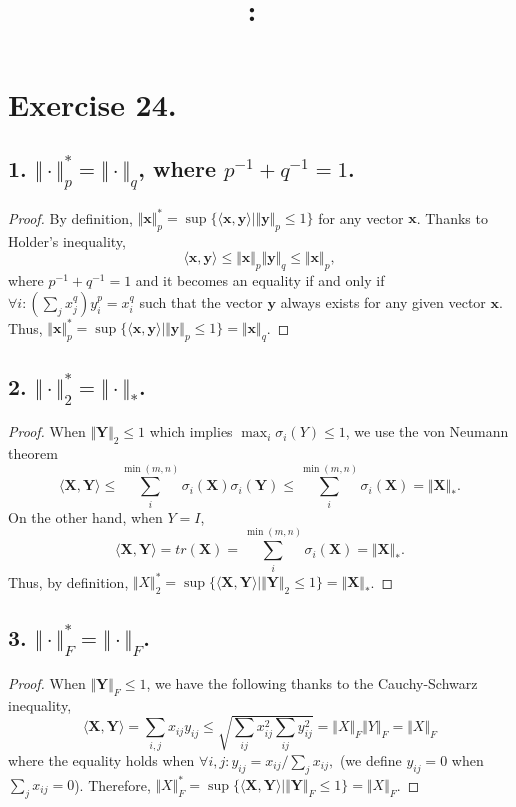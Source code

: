 \documentclass{article}
\date{}
\title{
    \textmd{\textbf{\hmwkClass:\ \hmwkTitle}}\\
}
\author{\hmwkAuthorName}
\begin{document}
\maketitle

\section{Exercise 24.}

\subsection{1. $\Vert\cdot\Vert^{*}_p=\Vert\cdot\Vert_q$, where $p^{-1}+q^{-1} = 1$.}
\begin{proof}
By definition, $\Vert \mathbf{x} \Vert^{*}_p = \sup\{\langle \mathbf{x,y} \rangle|\Vert \mathbf{y} \Vert_p \leq 1\}$ for any vector $\mathbf x$. Thanks to Holder's inequality, 
$$
\langle \mathbf{x,y} \rangle \leq \Vert \mathbf x \Vert_p \Vert \mathbf y \Vert_q \leq \Vert \mathbf x \Vert_p,
$$
where $p^{-1}+q^{-1} = 1$ and it becomes an equality if and only if $\forall i:(\sum_j{x_j^q}) y_i^p = x_i^q$  such that the vector $\mathbf y$ always exists for any given vector $\mathbf x$. Thus, $\Vert \mathbf{x} \Vert^{*}_p = \sup\{\langle \mathbf{x,y} \rangle|\Vert \mathbf{y} \Vert_p \leq 1\} = \Vert \mathbf x \Vert_q$.
\end{proof} 
\subsection{2. $\Vert\cdot\Vert^{*}_2 = \Vert\cdot\Vert_{*}$.}
\begin{proof}
When $\Vert \mathbf{Y} \Vert_2 \leq 1$ which implies $\max_i\sigma_i(Y) \leq 1$, we use the von Neumann theorem
$$
\langle \mathbf{X,Y} \rangle \leq \sum_i^{\min(m,n)}\sigma_i(\mathbf X)\sigma_i(\mathbf Y) \leq \sum_i^{\min(m,n)}\sigma_i(\mathbf X) = \Vert \mathbf X \Vert_{*}.
$$
On the other hand, when $Y = I$,
$$
\langle \mathbf{X,Y} \rangle = tr(\mathbf X) = \sum_i^{\min(m,n)}\sigma_i(\mathbf X) = \Vert \mathbf X \Vert_{*}.
$$
Thus, by definition, $\Vert X\Vert^{*}_2 = \sup\{\langle \mathbf{X,Y} \rangle|\Vert \mathbf{Y} \Vert_2 \leq 1\} = \Vert \mathbf X \Vert_{*}$. 
\end{proof}
\subsection{3. $\Vert\cdot\Vert^{*}_F = \Vert\cdot\Vert_{F}$.}
\begin{proof}
When $\Vert \mathbf{Y} \Vert_F \leq 1$, we have the following thanks to the Cauchy-Schwarz inequality,
$$
\langle \mathbf{X,Y} \rangle =  \sum_{i,j} x_{ij}y_{ij}  
\leq \sqrt{\sum_{ij}x_{ij}^2\sum_{ij}y_{ij}^2} = \Vert X\Vert_{F} \Vert Y\Vert_{F} = \Vert X\Vert_{F}
$$
where the equality holds when $\forall i,j: y_{ij} = x_{ij}/\sum_j{x_{ij}},$ (we define $y_{ij} = 0$ when $\sum_j{x_{ij}} = 0$). Therefore,  $\Vert X\Vert^{*}_F = \sup\{\langle \mathbf{X,Y} \rangle|\Vert \mathbf{Y} \Vert_F \leq 1\} =\Vert X\Vert_{F}$.
\end{proof}
\end{document}
